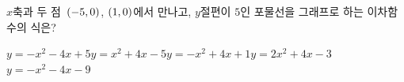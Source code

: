 $x$축과 두 점~$(-5{,}\mkern3mu 0)$, $(1{,}\mkern3mu 0)$에서 만나고, $y$절편이 $5$인 포물선을 그래프로 하는 이차함수의 식은?
\begin{choicesii}{$y=-x^2-4x+5$}{$y=x^2+4x-5$}{$y=-x^2+4x+1$}{$y=2x^2+4x-3$}{$y=-x^2-4x-9$}\end{choicesii}
